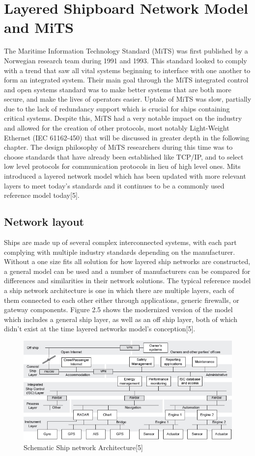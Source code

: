 \documentclass{report}
\begin{document}
\section{Layered Shipboard Network Model and MiTS}

The Maritime Information Technology Standard (MiTS) was first published by a Norwegian research team during 1991 and 1993. This standard looked to comply with a trend that saw all vital systems beginning to interface with one another to form an integrated system. Their main goal through the MiTS integrated control and open systems standard was to make better systems that are both more secure, and make the lives of operators easier. Uptake of MiTS was slow, partially due to the lack of redundancy support which is crucial for ships containing critical systems. Despite this, MiTS had a very notable impact on the industry and allowed for the creation of other protocols, most notably Light-Weight Ethernet (IEC 61162-450) that will be discussed in greater depth in the following chapter. The design philosophy of MiTS researchers during this time was to choose standards that have already been established like TCP/IP, and to select low level protocols for communication protocols in lieu of high level ones. Mits introduced a layered network model which has been updated with more relevant layers to meet today's standards and it continues to be a commonly used reference model today[5].


\subsection{Network layout}

Ships are made up of several complex interconnected systems, with each part complying with multiple industry standards depending on the manufacturer. Without a one size fits all solution for how layered ship networks are constructed, a general model can be used and a number of manufacturers can be compared for differences and similarities in their network solutions. The typical reference model a ship network architecture is one in which there are multiple layers, each of them connected to each other either through applications, generic firewalls, or gateway components. Figure 2.5 shows the modernized version of the model which includes a general ship layer, as well as an off ship layer, both of which didn't exist at the time layered networks model's conception[5].
\begin{figure}[h]
    \centering
    \includegraphics[width=12cm]{Images and Figures/isc-arch.jpg}
    \caption{Schematic Ship network Architecture[5]}
    \label{fig:network}
\end{figure}
\end{document}
